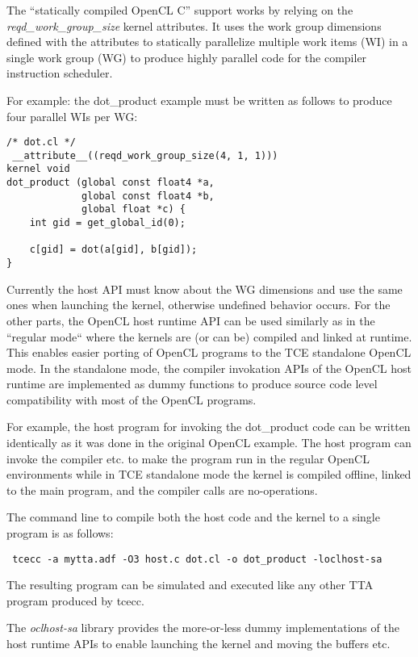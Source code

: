 \documentclass[twoside]{tceusermanual}
\begin{document}
The ``statically compiled OpenCL C'' support works by relying on the
\textit{reqd\_work\_group\_size} kernel attributes. It uses the work
group dimensions defined with the attributes to statically parallelize 
multiple work items (WI) in a single work group (WG) to produce highly 
parallel code for the compiler instruction scheduler.

For example: the dot\_product example must be written as follows to
produce four parallel WIs per WG:

\begin{verbatim}
/* dot.cl */
 __attribute__((reqd_work_group_size(4, 1, 1)))
kernel void
dot_product (global const float4 *a,
             global const float4 *b, 
             global float *c) {
    int gid = get_global_id(0);

    c[gid] = dot(a[gid], b[gid]);    
} 
\end{verbatim}

Currently the host API must know about the WG dimensions and use the
same ones when launching the kernel, otherwise undefined behavior
occurs. For the other parts, the OpenCL host runtime API can be used 
similarly as in the ``regular mode`` where the kernels are (or can be)
compiled and linked at runtime. This enables easier porting 
of OpenCL programs to the TCE standalone OpenCL mode. In the
standalone mode, the compiler invokation APIs of the OpenCL host runtime 
are implemented as dummy functions to produce source code level 
compatibility with most of the OpenCL programs.

For example, the host program for invoking the dot\_product code
can be written identically as it was done in the original OpenCL
example. The host program can invoke the compiler etc. to make
the program run in the regular OpenCL environments while in TCE
standalone mode the kernel is compiled offline, linked to the
main program, and the compiler calls are no-operations.

The command line to compile both the host code and the kernel to
a single program is as follows:

\begin{verbatim}
 tcecc -a mytta.adf -O3 host.c dot.cl -o dot_product -loclhost-sa
\end{verbatim}

The resulting program can be simulated and executed like any 
other TTA program produced by tcecc.

The \textit{oclhost-sa} library provides the more-or-less dummy
implementations of the host runtime APIs to enable launching the
kernel and moving the buffers etc.
\end{document}
